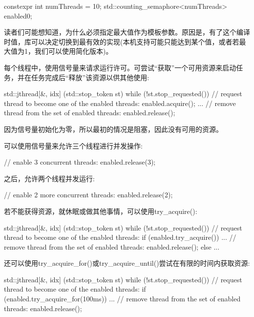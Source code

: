 \begin{cpp}
constexpr int numThreads = 10;
std::counting_semaphore<numThreads> enabled{0};
\end{cpp}

读者们可能想知道，为什么必须指定最大值作为模板参数。原因是，有了这个编译时值，库可以决定切换到最有效的实现(本机支持可能只能达到某个值，或者若最大值为1，我们可以使用简化版本)。

每个线程中，使用信号量来请求运行许可。可尝试“获取”一个可用资源来启动任务，并在任务完成后“释放”该资源以供其他使用:

\begin{cpp}
std::jthread{[&, idx] (std::stop_token st) {
				while (!st.stop_requested()) {
					// request thread to become one of the enabled threads:
					enabled.acquire();
					...
					// remove thread from the set of enabled threads:
					enabled.release();
				}
		}}
\end{cpp}

因为信号量初始化为零，所以最初的情况是阻塞，因此没有可用的资源。

可以使用信号量来允许三个线程进行并发操作:

\begin{cpp}
// enable 3 concurrent threads:
enabled.release(3);
\end{cpp}

之后，允许两个线程并发运行:

\begin{cpp}
// enable 2 more concurrent threads:
enabled.release(2);
\end{cpp}

若不能获得资源，就休眠或做其他事情，可以使用try\_acquire():

\begin{cpp}
std::jthread{[&, idx] (std::stop_token st) {
				while (!st.stop_requested()) {
					// request thread to become one of the enabled threads:
					if (enabled.try_acquire()) {
						...
						// remove thread from the set of enabled threads:
						enabled.release();
					}
					else {
						...
					}
				}
		}}
\end{cpp}

还可以使用try\_acquire\_for()或try\_acquire\_until()尝试在有限的时间内获取资源:

\begin{cpp}
std::jthread{[&, idx] (std::stop_token st) {
		while (!st.stop_requested()) {
			// request thread to become one of the enabled threads:
			if (enabled.try_acquire_for(100ms)) {
				...
				// remove thread from the set of enabled threads:
				enabled.release();
				}
			}
		}}
\end{cpp}

